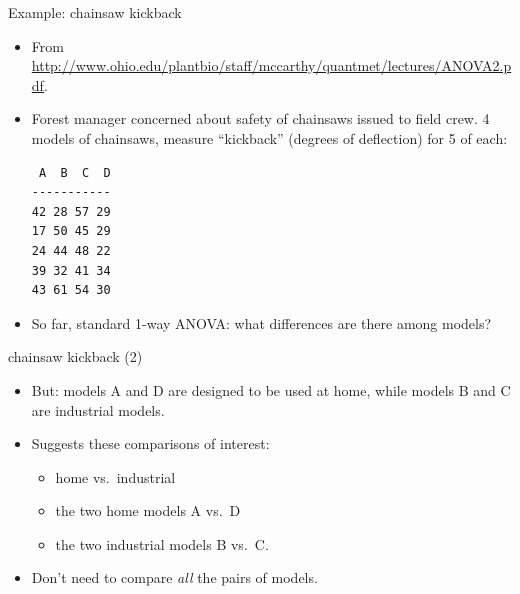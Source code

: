 \begin{frame}[fragile]{Example: chainsaw kickback}
  
  \begin{itemize}
    \item From \url{http://www.ohio.edu/plantbio/staff/mccarthy/quantmet/lectures/ANOVA2.pdf}.
  \item Forest manager concerned about safety of chainsaws issued to
    field crew. 4 models of chainsaws, measure ``kickback'' (degrees
    of deflection) for 5 of each:
    
\begin{verbatim}
 A  B  C  D
-----------
42 28 57 29
17 50 45 29
24 44 48 22
39 32 41 34
43 61 54 30
\end{verbatim}
    
    \item So far, standard 1-way ANOVA: what differences are there
      among models?
  \end{itemize}
  
\end{frame}

\begin{frame}[fragile]{chainsaw kickback (2)}
  
  \begin{itemize}
    \item But: models A and D are designed to be used at home, while
      models B and C are industrial models.
    \item Suggests these comparisons of interest:
      \begin{itemize}
      \item home vs.\ industrial
      \item the two home models A vs.\ D
      \item the two industrial models B vs.\ C.
      \end{itemize}
    \item Don't need to compare \emph{all} the pairs of models.

  \end{itemize}
  
\end{frame}

